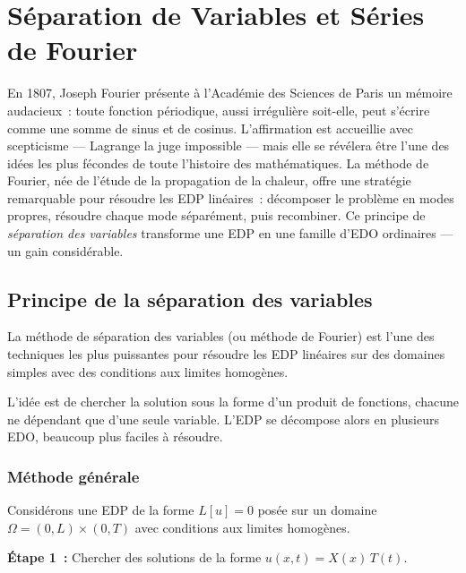 \chapter{S\'eparation de Variables et S\'eries de Fourier}
\label{ch:fourier}

En 1807, Joseph Fourier pr\'esente \`a l'Acad\'emie des Sciences de Paris un m\'emoire audacieux~: toute fonction p\'eriodique, aussi irr\'eguli\`ere soit-elle, peut s'\'ecrire comme une somme de sinus et de cosinus. L'affirmation est accueillie avec scepticisme --- Lagrange la juge impossible --- mais elle se r\'ev\'elera \^etre l'une des id\'ees les plus f\'econdes de toute l'histoire des math\'ematiques. La m\'ethode de Fourier, n\'ee de l'\'etude de la propagation de la chaleur, offre une strat\'egie remarquable pour r\'esoudre les EDP lin\'eaires~: d\'ecomposer le probl\`eme en modes propres, r\'esoudre chaque mode s\'epar\'ement, puis recombiner. Ce principe de \emph{s\'eparation des variables} transforme une EDP en une famille d'EDO ordinaires --- un gain consid\'erable.

\section{Principe de la s\'eparation des variables}

La m\'ethode de s\'eparation des variables (ou m\'ethode de Fourier) est l'une
des techniques les plus puissantes pour r\'esoudre les EDP lin\'eaires sur des
domaines simples avec des conditions aux limites homog\`enes.

\begin{intuition}
L'id\'ee est de chercher la solution sous la forme d'un produit de fonctions,
chacune ne d\'ependant que d'une seule variable. L'EDP se d\'ecompose alors
en plusieurs EDO, beaucoup plus faciles \`a r\'esoudre.
\end{intuition}

\subsection{M\'ethode g\'en\'erale}

Consid\'erons une EDP de la forme $L[u] = 0$ pos\'ee sur un domaine
$\Omega = (0,L) \times (0,T)$ avec conditions aux limites homog\`enes.

\textbf{\'Etape 1~:} Chercher des solutions de la forme $u(x,t) = X(x)\, T(t)$.

